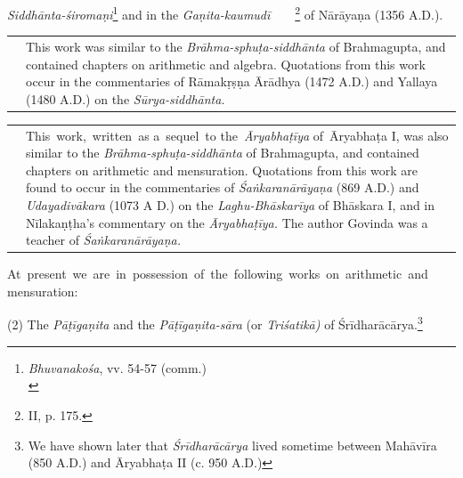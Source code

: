 \documentclass[10pt, openany]{book}
\begin{document}
{\hspace{5.5mm} \textit{Siddhānta-śiromaṇi}\renewcommand{\thefootnote}{1}\footnote{\hspace{-2mm} \englishfont \textit{Bhuvanakośa}, vv. 54-57 (comm.)\\} and in the
\textit{Gaṇita-kaumudī}~~~~\renewcommand{\thefootnote}{\hspace{-4.5mm} 2}\footnote{\hspace{-2mm} II, p. 175.} of Nārāyaṇa (1356 A.D.).


\vspace{0.3cm}
\begin{tabular}{p{} p{}}
&{This work was similar to the 
\textit{Brāhma-sphuṭa-siddhānta}}
{of Brahmagupta, and contained chapters on}
{arithmetic and algebra. Quotations from this}
{work occur in the commentaries of Rāmakṛṣṇa}
{Ārādhya (1472 A.D.) and Yallaya (1480 A.D.)}
{on the \textit{Sūrya-siddhānta.}}
\end{tabular}


\vspace{0.3cm}
\begin{tabular}{p{} p{}}
& {This \,work, \,written \,as a \,sequel \,to the \,\textit{Āryabhaṭīya} of \,Āryabhaṭa I, was also similar to the \textit{Brāhma-sphuṭa-siddhānta} of Brahmagupta}, and contained chapters
{on arithmetic and mensuration. Quotations from}
{this work are found to occur in the commentaries of}
{\textit{Śaṅkaranārāyaṇa }(869 A.D.) and \textit{Udayadivākara}}
{(1073  A D.) on the \textit{Laghu-Bhāskarīya} of Bhāskara}
{I, and in Nīlakaṇṭha's commentary on the \textit{Āryabhaṭīya.} The author Govinda was a teacher of}
\textit{Śaṅkaranārāyaṇa.}
\end{tabular}

\newpage

{At \,present \,we \,are \,in \,possession \,of \,the \,following \,works \,on \,arithmetic \,and mensuration:}


{(2) The \textit{Pāṭīgaṇita} and the \textit{Pāṭīgaṇita-sāra} (or \textit{Triśatikā)} of Śrīdharācārya.\renewcommand{\thefootnote}{1}\footnote{\hspace{-2mm} We have shown later that \textit{Śrīdharācārya} lived sometime between Mahāvīra (850 A.D.) and Āryabhaṭa II (c. 950 A.D.)}}

}
\end{document}
